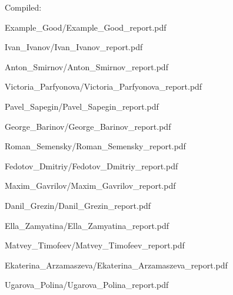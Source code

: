 \documentclass[a4paper]{article}
\begin{document}
Compiled: \DTMnow
\tableofcontents

\clearpage

{Example_Good/Example_Good_report.pdf}

{Ivan_Ivanov/Ivan_Ivanov_report.pdf}

{Anton_Smirnov/Anton_Smirnov_report.pdf}

{Victoria_Parfyonova/Victoria_Parfyonova_report.pdf}

{Pavel_Sapegin/Pavel_Sapegin_report.pdf}

{George_Barinov/George_Barinov_report.pdf}

{Roman_Semensky/Roman_Semensky_report.pdf}

{Fedotov_Dmitriy/Fedotov_Dmitriy_report.pdf}

{Maxim_Gavrilov/Maxim_Gavrilov_report.pdf}

{Danil_Grezin/Danil_Grezin_report.pdf}

{Ella_Zamyatina/Ella_Zamyatina_report.pdf}

{Matvey_Timofeev/Matvey_Timofeev_report.pdf}

{Ekaterina_Arzamaszeva/Ekaterina_Arzamaszeva_report.pdf}

{Ugarova_Polina/Ugarova_Polina_report.pdf}

\end{document}
